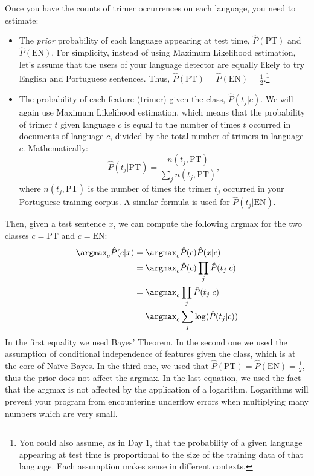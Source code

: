 Once you have the counts of trimer occurrences on each language, you need to estimate:
\begin{itemize}
	\item The \emph{prior} probability of each language appearing at test time, ${\hat P}(\text{PT})$ and ${\hat P}(\text{EN})$. For simplicity, instead of using Maximum Likelihood estimation, let's assume that the users of your language detector are equally likely to try English and Portuguese sentences. Thus, ${\hat P}(\text{PT}) = {\hat P}(\text{EN}) = \frac{1}{2}$.\footnote{You could also assume, as in Day 1, that the probability of a given language appearing at test time is proportional to the size of the training data of that language. Each assumption makes sense in different contexts.}
	\item The probability of each feature (trimer) given the class, ${\hat P}(t_j | c)$. We will again use Maximum Likelihood estimation, which means that the probability of trimer $t$ given language $c$ is equal to the number of times $t$ occurred in documents of language $c$, divided by the total number of trimers in language $c$. Mathematically:
\begin{equation}
{\hat P}(t_j|\text{PT}) = \frac{n(t_j,\text{PT})}{\sum_j n(t_j,\text{PT})},
\end{equation}
where $n(t_j,\text{PT})$ is the number of times the trimer $t_j$ occurred in your Portuguese training corpus. A similar formula is used for ${\hat P}(t_j|\text{EN})$.
\end{itemize}

Then, given a test sentence $x$, we can compute the following argmax for the two classes $c = \text{PT}$ and $c = \text{EN}$:
%
\begin{eqnarray}
\argmax_c {\hat P}(c | x) &= \argmax_c {\hat P}(c) {\hat P}(x | c) \nonumber\\
&= \argmax_c {\hat P}(c) \prod_j {\hat P}(t_j | c) \nonumber\\
&= \argmax_c \prod_j {\hat P}(t_j | c) \nonumber\\
&= \argmax_c \sum_j \log({\hat P}(t_j | c))\label{eq:NBformula}
\end{eqnarray}
%
In the first equality we used Bayes' Theorem. In the second one we used the assumption of conditional independence of features given the class, which is at the core of Na\"{i}ve Bayes. In the third one, we used that ${\hat P}(\text{PT}) = {\hat P}(\text{EN}) = \frac{1}{2}$, thus the prior does not affect the argmax. In the last equation, we used the fact that the argmax is not affected by the application of a logarithm. Logarithms will prevent your program from encountering underflow errors when multiplying many numbers which are very small.

